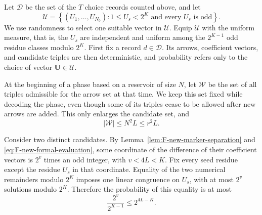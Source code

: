 \documentclass{article}
\theoremstyle{definition}
\begin{document}
Let $\mathcal D$ be the set of the $T$ choice records counted above, and let
$$
 \mathcal U=
 \left\{(U_1,\ldots,U_{N_0}):
 1\leq U_s<2^K\text{ and every }U_s\text{ is odd}\right\}.
$$
We use randomness to select one suitable vector in $\mathcal U$.
Equip $\mathcal U$ with the uniform measure, that is, the $U_s$ are
independent and uniform among the $2^{K-1}$ odd residue classes modulo $2^K$.
First fix a record $d\in\mathcal D$.  Its arrows, coefficient vectors, and
candidate triples are then deterministic, and probability refers only to the
choice of vector $\mathbf U\in\mathcal U$.

At the beginning of a phase based on a reservoir of size $N$, let
$\mathcal W$ be the set of all triples admissible for the arrow set at that
time.  We keep this set fixed while decoding the phase, even though some of
its triples cease to be allowed after new arrows are added.  This only enlarges
the candidate set, and
$$
 |\mathcal W|\leq N^2L\leq r^2L.
$$

Consider two distinct candidates.  By Lemma~\ref{lem:F-new-marker-separation}
and \eqref{eq:F-new-formal-evaluation},
some coordinate of the difference of their coefficient vectors is $2^v$
times an odd integer, with $v<4L<K$.  Fix every seed residue except the residue
$U_s$ in that coordinate.  Equality of the two numerical remainders modulo
$2^K$ imposes one linear congruence on $U_s$, with at most $2^v$ solutions
modulo $2^K$.  Therefore the probability of this equality is at most
$$
 \frac{2^v}{2^{K-1}}\leq2^{4L-K}.
$$
\end{document}
